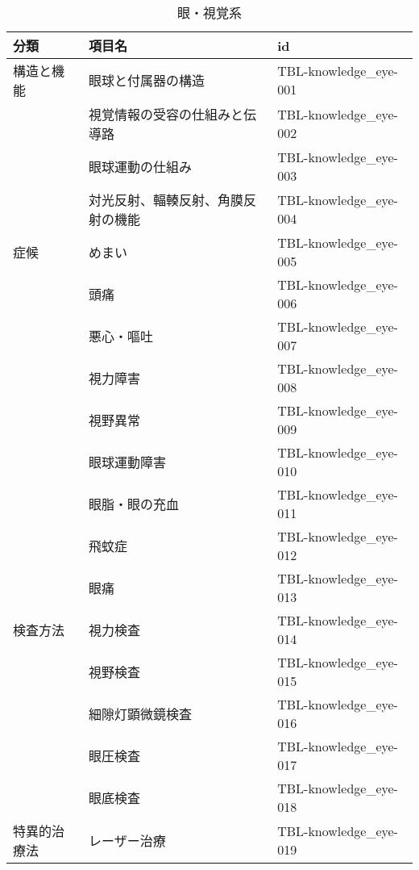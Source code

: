 \begin{xltabular}{\linewidth}{XXX}
\caption{\label{tbl:knowledge_eye}眼・視覚系} \\
\toprule
分類 & 項目名 & id \\
\midrule
\endhead
構造と機能 & 眼球と付属器の構造 & TBL-knowledge_eye-001 \\
 & 視覚情報の受容の仕組みと伝導路 & TBL-knowledge_eye-002 \\
 & 眼球運動の仕組み & TBL-knowledge_eye-003 \\
 & 対光反射、輻輳反射、角膜反射の機能 & TBL-knowledge_eye-004 \\
症候 & めまい & TBL-knowledge_eye-005 \\
 & 頭痛 & TBL-knowledge_eye-006 \\
 & 悪心・嘔吐 & TBL-knowledge_eye-007 \\
 & 視力障害 & TBL-knowledge_eye-008 \\
 & 視野異常 & TBL-knowledge_eye-009 \\
 & 眼球運動障害 & TBL-knowledge_eye-010 \\
 & 眼脂・眼の充血 & TBL-knowledge_eye-011 \\
 & 飛蚊症 & TBL-knowledge_eye-012 \\
 & 眼痛 & TBL-knowledge_eye-013 \\
検査方法 & 視力検査 & TBL-knowledge_eye-014 \\
 & 視野検査 & TBL-knowledge_eye-015 \\
 & 細隙灯顕微鏡検査 & TBL-knowledge_eye-016 \\
 & 眼圧検査 & TBL-knowledge_eye-017 \\
 & 眼底検査 & TBL-knowledge_eye-018 \\
特異的治療法 & レーザー治療 & TBL-knowledge_eye-019 \\
\bottomrule
\end{xltabular}

